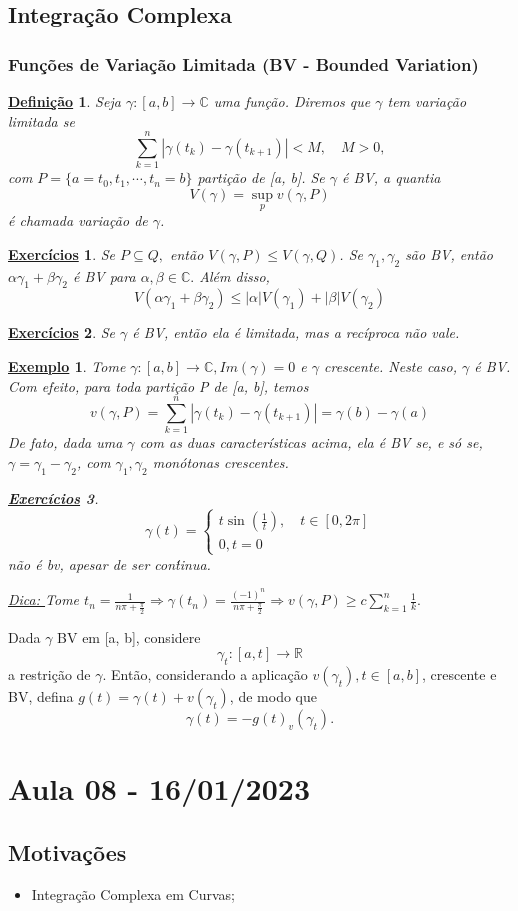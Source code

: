 \documentclass{article}
\newtheorem*{def*}{\underline{Defini\c c\~ao}}
\newtheorem{example}{\underline{Exemplo}}[section]
\newtheorem*{exer*}{\underline{Exerc\'icios}}
\begin{document}
 \subsection{Integra\c c\~ao Complexa}
 \subsubsection{Fun\c c\~oes de Varia\c c\~ao Limitada (BV - Bounded Variation)}
\begin{def*}
 Seja $\gamma:[a, b]\rightarrow \mathbb{C}$ uma fun\c c\~ao. Diremos que $\gamma$ tem varia\c c\~ao limitada se 
 $$
 \sum\limits_{k=1}^{n}|\gamma(t_{k}) - \gamma(t_{k+1})| < M, \quad M > 0,
 $$
 com $P = \{a=t_{0}, t_1, \cdots, t_n = b\} $ parti\c c\~ao de [a, b]. Se $\gamma$ \'e BV, a quantia
 $$
 V(\gamma) = \sup_p v(\gamma, P)
 $$
 \'e chamada varia\c c\~ao de $\gamma$.
\end{def*}
\begin{exer*}
  Se $P\subseteq{Q}, $ ent\~ao $V(\gamma, P)\leq{V(\gamma, Q)}$. Se $\gamma_1, \gamma_2$ s\~ao BV, ent\~ao $\alpha \gamma_1 + \beta \gamma_2$
\'e BV para $\alpha, \beta\in \mathbb{C}.$ Al\'em disso, 
  $$
  V(\alpha \gamma_1 + \beta \gamma_2) \leq |\alpha|V(\gamma_1) + |\beta|V(\gamma_2)
  $$
\end{exer*}
\begin{exer*}
  Se $\gamma$ \'e BV, ent\~ao ela \'e limitada, mas a rec\'iproca n\~ao vale.
\end{exer*}
\begin{example}
  Tome $\gamma:[a, b]\rightarrow \mathbb{C}, Im(\gamma) = 0$ e $\gamma$ crescente. Neste caso, $\gamma$ \'e BV. Com efeito, para
toda parti\c c\~ao P de [a, b], temos 
  $$
  v(\gamma, P) = \sum\limits_{k=1}^{n}|\gamma(t_{k}) - \gamma(t_{k+1})| = \gamma(b) - \gamma(a)
  $$
  De fato, dada uma $\gamma$ com as duas caracter\'isticas acima, ela \'e BV se, e s\'o se, $\gamma = \gamma_1 - \gamma_2$, com
 $\gamma_1, \gamma_2$ mon\'otonas crescentes.
 \begin{exer*}
   $$
   \gamma(t) = \left\{\begin{array}{ll}
       t\sin{(\frac{1}{t})}, \quad t\in[0, 2\pi] \\
       0, t= 0
  \end{array}\right.
  $$
  n\~ao \'e bv, apesar de ser con\'tinua.

  \underline{Dica: } Tome $t_{n} =\displaystyle \frac{1}{n\pi + \frac{\pi}{2}}\Rightarrow \gamma(t_{n}) =\displaystyle \frac{(-1)^n}{n\pi + \frac{\pi}{2}}\Rightarrow
v(\gamma, P) \geq c \sum\limits_{k=1}^{n}\frac{1}{k}.$
 \end{exer*}
\end{example}
Dada $\gamma$ BV em [a, b], considere 
  $$
  \gamma_t:[a, t]\rightarrow \mathbb{R}
  $$
  a restri\c c\~ao de $\gamma.$ Ent\~ao, considerando a aplica\c c\~ao $v(\gamma_t), t\in[a, b]$, crescente e BV, defina $
g(t) = \gamma(t) + v(\gamma_t)$, de modo que
  $$
  \gamma(t) = -g(t) _ v(\gamma_t).
  $$
  \newpage

\section{Aula 08 - 16/01/2023}
\subsection{Motiva\c c\~oes}
 \begin{itemize}
   \item Integra\c c\~ao Complexa em Curvas;
 \end{itemize}
\end{document}
